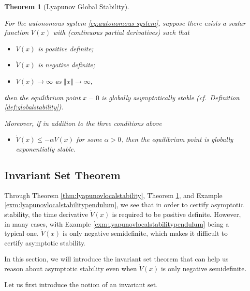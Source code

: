 \documentclass[
]{book}
\providecommand{\tightlist}{%
  \setlength{\itemsep}{0pt}\setlength{\parskip}{0pt}}
\newtheorem{theorem}{Theorem}[chapter]
\theoremstyle{definition}
\theoremstyle{definition}
\theoremstyle{definition}
\theoremstyle{definition}
\theoremstyle{remark}
\begin{document}
\begin{theorem}[Lyapunov Global Stability]
\protect\hypertarget{thm:lyapunovglobalstability}{}\label{thm:lyapunovglobalstability}

For the autonomous system \eqref{eq:autonomous-system}, suppose there exists a scalar function \(V(x)\) with (continuous partial derivatives) such that

\begin{itemize}
\item
  \(V(x)\) is positive definite;
\item
  \(\dot{V}(x)\) is negative definite;
\item
  \(V(x) \rightarrow \infty\) as \(\Vert x \Vert \rightarrow \infty\),
\end{itemize}

then the equilibrium point \(x = 0\) is globally asymptotically stable (cf.~Definition \ref{def:globalstability}).

Moreover, if in addition to the three conditions above

\begin{itemize}
\tightlist
\item
  \(\dot{V}(x) \leq - \alpha V(x)\) for some \(\alpha > 0\), then the equilibrium point is globally exponentially stable.
\end{itemize}

\end{theorem}

\hypertarget{invariant-set-theorem}{%
\subsection{Invariant Set Theorem}\label{invariant-set-theorem}}

Through Theorem \ref{thm:lyapunovlocalstability}, Theorem \ref{thm:lyapunovglobalstability}, and Example \ref{exm:lyapunovlocalstabilitypendulum}, we see that in order to certify asymptotic stability, the time derivative \(\dot{V}(x)\) is required to be positive definite. However, in many cases, with Example \ref{exm:lyapunovlocalstabilitypendulum} being a typical one, \(\dot{V}(x)\) is only negative semidefinite, which makes it difficult to certify asymptotic stability.

In this section, we will introduce the invariant set theorem that can help us reason about asymptotic stability even when \(\dot{V}(x)\) is only negative semidefinite.

Let us first introduce the notion of an invariant set.
\end{document}
